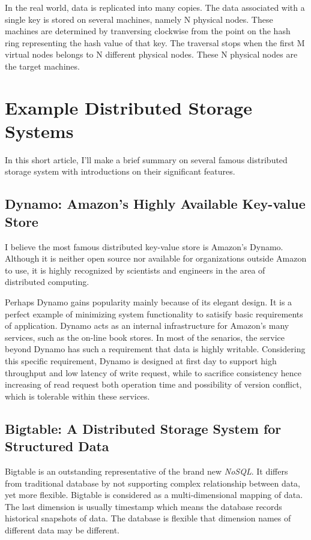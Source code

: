 In the real world, data is replicated into many copies. The data associated
with a single key is stored on several machines, namely N physical nodes.
These machines are determined by tranversing clockwise from the point on the
hash ring representing the hash value of that key. The traversal stops when
the first M virtual nodes belongs to N different physical nodes. These N
physical nodes are the target machines.

\section*{Example Distributed Storage Systems}
In this short article, I'll make a brief summary on several famous distributed
storage system with introductions on their significant features.

\subsection*{Dynamo: Amazon's Highly Available Key-value Store}
I believe the most famous distributed key-value store is Amazon's
Dynamo\cite{hastorun2007dynamo}. Although it is neither open source nor
available for organizations outside Amazon to use, it is highly recognized by
scientists and engineers in the area of distributed computing.

Perhaps Dynamo gains popularity mainly because of its elegant design. It is a
perfect example of minimizing system functionality to satisify basic
requirements of application. Dynamo acts as an internal infrastructure for
Amazon's many services, such as the on-line book stores. In most of the
senarios, the service beyond Dynamo has such a requirement that data is highly
writable. Considering this specific requirement, Dynamo is designed at first
day to support high throughput and low latency of write request, while to
sacrifice consistency hence increasing of read request both operation time and
possibility of version conflict, which is tolerable within these services.

\subsection*{Bigtable: A Distributed Storage System for Structured Data}
Bigtable\cite{chang2008bigtable} is an outstanding representative of the brand
new \emph{NoSQL}. It differs from traditional database by not supporting
complex relationship between data, yet more flexible. Bigtable is considered
as a multi-dimensional mapping of data. The last dimension is usually
timestamp which means the database records historical snapshots of data. The
database is flexible that dimension names of different data may be different.

